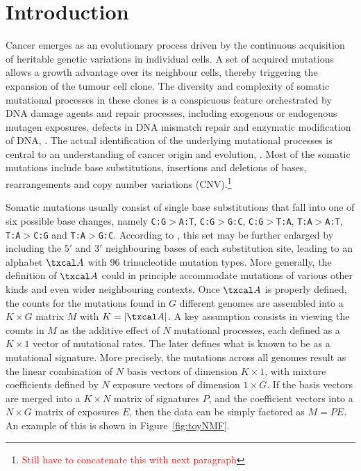 \documentclass{bioinfo}
\begin{document}
\section{Introduction}
Cancer emerges as an evolutionary process driven by the continuous
acquisition of heritable genetic variations in individual cells. A set
of acquired mutations allows a growth advantage over its neighbour
cells, thereby triggering the expansion of the tumour
cell clone. The diversity and complexity of somatic mutational
processes in these clones is a conspicuous feature orchestrated by DNA
damage agents and repair processes, including exogenous or endogenous
mutagen exposures, defects in DNA mismatch repair and enzymatic
modification of DNA, \cite{RG}. The actual identification of the
underlying mutational processes is central to an understanding of
cancer origin and evolution, \citealp{ANat, AS, HEN, RG}. Most of the 
somatic mutations include base substitutions, insertions and deletions
of bases, rearrangements and copy number variations
(CNV).\footnote{\textcolor{red}{Still have to concatenate this with
next paragraph}}


Somatic mutations usually consist of single base substitutions that
fall into one of six possible base changes, namely
\texttt{C:G}$>$\texttt{A:T}, \texttt{C:G}$>$\texttt{G:C},
\texttt{C:G}$>$\texttt{T:A}, \texttt{T:A}$>$\texttt{A:T},
\texttt{T:A}$>$\texttt{C:G} and \texttt{T:A}$>$\texttt{G:C}. According
to \cite{A}, this set may be further enlarged by including the $5'$
and $3'$ neighbouring bases of each substitution site, leading to an 
alphabet $\txcal A$ with 96 trinucleotide mutation types. More
generally, the definition of $\txcal A$ could in principle accommodate
mutations of various other kinds 
and even wider neighbouring contexts. Once $\txcal A$
is properly defined, the counts for the mutations found in $G$
different genomes are assembled into a $K\times G$ matrix $M$ with $K
= |\txcal A|$. A key assumption consists in viewing the counts in $M$
as the additive effect of $N$ mutational processes, each defined as a
$K\times 1$ vector of mutational rates. The later defines what
is known to be as a mutational signature. More precisely, the
mutations across all genomes result as the linear combination of $N$
basis vectors of dimension $K\times 1$, with mixture coefficients
defined by $N$ exposure vectors of dimension $1 \times G$. If the
basis vectors are merged into a $K\times N$ matrix of signatures $P$,
and the coefficient vectors into a $N\times G$ matrix of exposures
$E$, then the data can be simply factored as $M=PE$. An example of
this is shown in Figure~\ref{fig:toyNMF}. 
\end{document}
